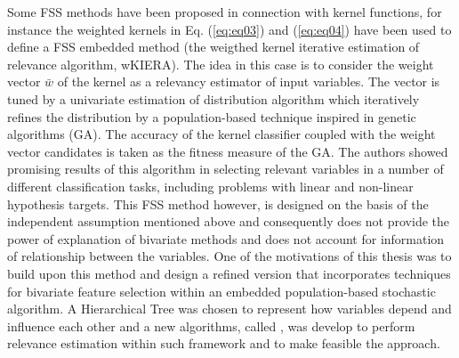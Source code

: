 Some FSS methods have been proposed in connection with kernel functions, for instance the weighted kernels in Eq. (\ref{eq:eq03}) and (\ref{eq:eq04}) have been used to define a FSS embedded method (the weigthed kernel iterative estimation of relevance algorithm, wKIERA\cite{rojas08}).  The idea in this case is to consider the weight vector \(\bar{w}\) of the kernel as a relevancy estimator of input variables. The vector is tuned by a univariate estimation of distribution algorithm \cite{larranaga01} which iteratively refines the distribution by a population-based technique inspired in genetic algorithms (GA)\cite{goldberg89}. The accuracy of the kernel classifier coupled with the weight vector candidates is taken as the fitness measure of the GA.  The authors showed promising results of this algorithm in selecting relevant variables in a number of different classification tasks, including problems with linear and non-linear hypothesis targets. This FSS method however, is designed on the basis of the independent assumption mentioned above and consequently does not provide the power of explanation of bivariate methods and does not account for information of relationship between the variables. One of the motivations of this thesis was to build upon this method and design a refined version that incorporates techniques for bivariate feature selection within an embedded population-based stochastic algorithm. A Hierarchical Tree was chosen to represent how variables depend and influence each other and a new algorithms, called \WKII, was develop to perform relevance estimation within such framework and to make feasible the approach. 

